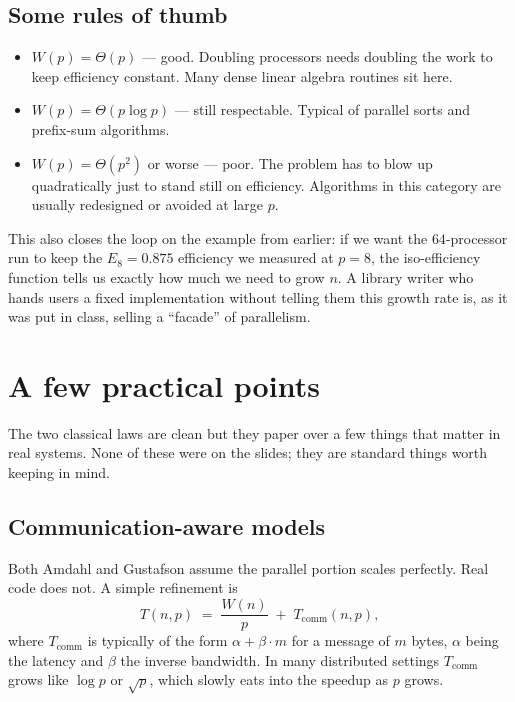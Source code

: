 \subsection{Some rules of thumb}

\begin{itemize}
  \item $W(p) = \Theta(p)$ --- good. Doubling processors needs doubling
        the work to keep efficiency constant. Many dense linear algebra
        routines sit here.
  \item $W(p) = \Theta(p \log p)$ --- still respectable. Typical of
        parallel sorts and prefix-sum algorithms.
  \item $W(p) = \Theta(p^2)$ or worse --- poor. The problem has to blow
        up quadratically just to stand still on efficiency. Algorithms in
        this category are usually redesigned or avoided at large $p$.
\end{itemize}

This also closes the loop on the example from earlier: if we want the
$64$-processor run to keep the $E_8 = 0.875$ efficiency we measured at
$p=8$, the iso-efficiency function tells us exactly how much we need to
grow $n$. A library writer who hands users a fixed implementation without
telling them this growth rate is, as it was put in class, selling a
``facade'' of parallelism.

\section{A few practical points}

The two classical laws are clean but they paper over a few things that
matter in real systems. None of these were on the slides; they are
standard things worth keeping in mind.

\subsection{Communication-aware models}

Both Amdahl and Gustafson assume the parallel portion scales perfectly.
Real code does not. A simple refinement is
\[
T(n,p) \;=\; \frac{W(n)}{p} \;+\; T_{\text{comm}}(n,p),
\]
where $T_{\text{comm}}$ is typically of the form $\alpha + \beta \cdot m$
for a message of $m$ bytes, $\alpha$ being the latency and $\beta$ the
inverse bandwidth. In many distributed settings $T_{\text{comm}}$ grows
like $\log p$ or $\sqrt{p}$, which slowly eats into the speedup as $p$
grows.

